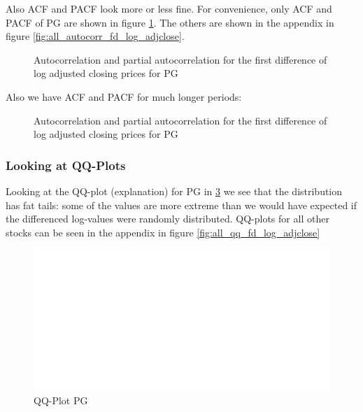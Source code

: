 Also ACF and PACF look more or less fine. For convenience, only ACF and PACF of PG are shown in figure \ref{fig:PG_autocorr_fd_log_adjclose}. The others are shown in the appendix in figure \ref{fig:all_autocorr_fd_log_adjclose}.
\begin{figure}[H]
    \centering
    \begin{adjustbox}{width=.9\textwidth,center}
    
    \end{adjustbox}  
    \caption{Autocorrelation and partial autocorrelation for the first difference of log adjusted closing prices for PG}
    \label{fig:PG_autocorr_fd_log_adjclose}
\end{figure}{}

Also we have ACF and PACF for much longer periods: 
\begin{figure}[H]
    \centering
    \begin{adjustbox}{width=.9\textwidth,center}
    
    \end{adjustbox}  
    \caption{Autocorrelation and partial autocorrelation for the first difference of log adjusted closing prices for PG}
    \label{fig:PG_autocorr_fd_log_adjclose_all_lags}
\end{figure}{}




\subsubsection*{Looking at QQ-Plots}
Looking at the QQ-plot (explanation) for PG in \ref{fig:PG_qq_fd_log_adjclose} we see that the distribution has fat tails: some of the values are more extreme than we would have expected if the differenced log-values were randomly distributed. QQ-plots for all other stocks can be seen in the appendix in figure \ref{fig:all_qq_fd_log_adjclose}

\begin{figure}[h]
    \centering
    \begin{adjustbox}{width=.9\textwidth,center}
    \includegraphics[]{figures/PG_log_adjclose_fd_and_qq.pdf}
    \end{adjustbox}  
    \caption{QQ-Plot PG}
    \label{fig:PG_qq_fd_log_adjclose}
\end{figure}{}
